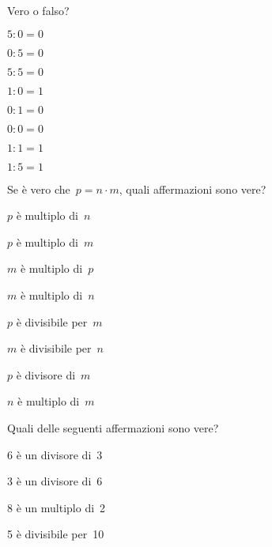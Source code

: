 \begin{esercizio}
\label{ese:1.3}
 Vero o falso?
\begin{multicols}{2}
\TabPositions{3.2cm}
\begin{enumeratea}
 \item $5:0=0$	\tab\qquad\boxV\qquad\boxF
 \item $0:5=0$	\tab\qquad\boxV\qquad\boxF
 \item $5:5=0$	\tab\qquad\boxV\qquad\boxF
 \item $1:0=1$	\tab\qquad\boxV\qquad\boxF
 \item $0:1=0$	\tab\qquad\boxV\qquad\boxF
 \item $0:0=0$	\tab\qquad\boxV\qquad\boxF
 \item $1:1=1$	\tab\qquad\boxV\qquad\boxF
 \item $1:5=1$	\tab\qquad\boxV\qquad\boxF
\end{enumeratea}
\end{multicols}
\end{esercizio}

\begin{esercizio}
\label{ese:1.4}
 Se è vero che~$p=n\cdot m$, quali affermazioni sono vere?
\begin{multicols}{2}
\TabPositions{3.2cm}
\begin{enumeratea}
 \item $p$ è multiplo di~$n$	\tab\qquad\boxV\qquad\boxF
 \item $p$ è multiplo di~$m$	\tab\qquad\boxV\qquad\boxF
 \item $m$ è multiplo di~$p$	\tab\qquad\boxV\qquad\boxF
 \item $m$ è multiplo di~$n$	\tab\qquad\boxV\qquad\boxF
 \item $p$ è divisibile per~$m$	\tab\qquad\boxV\qquad\boxF
 \item $m$ è divisibile per~$n$	\tab\qquad\boxV\qquad\boxF
 \item $p$ è divisore di~$m$	\tab\qquad\boxV\qquad\boxF
 \item $n$ è multiplo di~$m$	\tab\qquad\boxV\qquad\boxF
\end{enumeratea}
\end{multicols}
\end{esercizio}

\begin{esercizio}
\label{ese:1.5}
 Quali delle seguenti affermazioni sono vere?

\begin{multicols}{2}
\TabPositions{3.2cm}
 \begin{enumeratea}
 \item 6 è un divisore di~3 \tab\qquad\boxV\qquad\boxF
 \item 3 è un divisore di~6 \tab\qquad\boxV\qquad\boxF
 \item 8 è un multiplo di~2 \tab\qquad\boxV\qquad\boxF
 \item 5 è divisibile per~10 \tab\qquad\boxV\qquad\boxF
 \end{enumeratea}
\end{multicols}
\end{esercizio}

